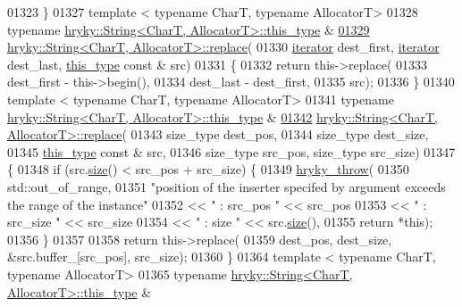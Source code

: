 \begin{DoxyCode}
01323 \}
01327 \textcolor{keyword}{template} < \textcolor{keyword}{typename} CharT, \textcolor{keyword}{typename} AllocatorT>
01328 \textcolor{keyword}{typename} \hyperlink{classhryky_1_1_string}{hryky::String<CharT, AllocatorT>::this_type} &
\hypertarget{string_8h_source_l01329}{}\hyperlink{classhryky_1_1_string_af3bde22af32eb64c88f9cf70ba00a7df}{01329} \hyperlink{classhryky_1_1_string}{hryky::String<CharT, AllocatorT>::replace}(
01330     \hyperlink{classhryky_1_1iterator_1_1random_1_1_mutable}{iterator} dest\_first, \hyperlink{classhryky_1_1iterator_1_1random_1_1_mutable}{iterator} dest\_last, \hyperlink{classhryky_1_1_string}{this_type} \textcolor{keyword}{const} & src)
01331 \{
01332     \textcolor{keywordflow}{return} this->replace(
01333         dest\_first - this->begin(),
01334         dest\_last - dest\_first,
01335         src);
01336 \}
01340 \textcolor{keyword}{template} < \textcolor{keyword}{typename} CharT, \textcolor{keyword}{typename} AllocatorT>
01341 \textcolor{keyword}{typename} \hyperlink{classhryky_1_1_string}{hryky::String<CharT, AllocatorT>::this_type} &
\hypertarget{string_8h_source_l01342}{}\hyperlink{classhryky_1_1_string_af4b644fb8a0862e04f5ff123b7578ee6}{01342} \hyperlink{classhryky_1_1_string}{hryky::String<CharT, AllocatorT>::replace}(
01343     size\_type dest\_pos,
01344     size\_type dest\_size,
01345     \hyperlink{classhryky_1_1_string}{this_type} \textcolor{keyword}{const} & src,
01346     size\_type src\_pos, size\_type src\_size)
01347 \{
01348     \textcolor{keywordflow}{if} (src.\hyperlink{classhryky_1_1_string_a9db0f71dce7b2de86a54ab5323759265}{size}() < src\_pos + src\_size) \{
01349         \hyperlink{debug__common_8h_af50606eac4009921527ddcaed392b2c2}{hryky_throw}(
01350             std::out\_of\_range,
01351             \textcolor{stringliteral}{"position of the inserter specifed by argument exceeds the range of
       the instance"}
01352             << \textcolor{stringliteral}{" : src\_pos "} << src\_pos
01353             << \textcolor{stringliteral}{" : src\_size "} << src\_size
01354             << \textcolor{stringliteral}{" : size "} << src.\hyperlink{classhryky_1_1_string_a9db0f71dce7b2de86a54ab5323759265}{size}(),
01355             \textcolor{keywordflow}{return} *\textcolor{keyword}{this});
01356     \}
01357 
01358     \textcolor{keywordflow}{return} this->replace(
01359         dest\_pos, dest\_size, &src.buffer\_[src\_pos], src\_size);
01360 \}
01364 \textcolor{keyword}{template} < \textcolor{keyword}{typename} CharT, \textcolor{keyword}{typename} AllocatorT>
01365 \textcolor{keyword}{typename} \hyperlink{classhryky_1_1_string}{hryky::String<CharT, AllocatorT>::this_type} &

\end{DoxyCode}
